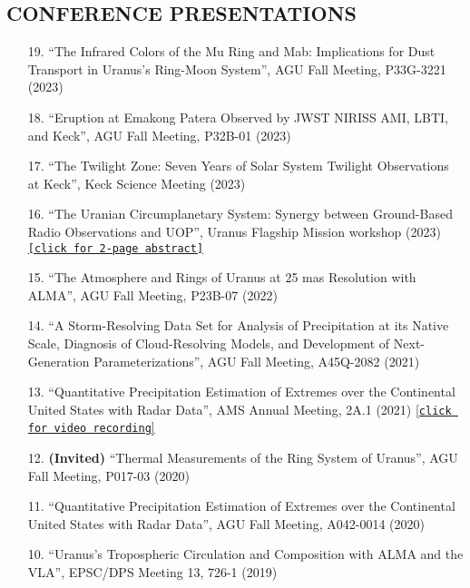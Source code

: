 \documentclass[margin, 10pt]{res} %
\begin{document}
\begin{resume}

\section{CONFERENCE PRESENTATIONS}


\begin{enumerate}
	
\item[19.] ``The Infrared Colors of the Mu Ring and Mab: Implications for Dust Transport in Uranus's Ring-Moon System'', AGU Fall Meeting, P33G-3221 (2023)
\item[18.] ``Eruption at Emakong Patera Observed by JWST NIRISS AMI, LBTI, and Keck'', AGU Fall Meeting, P32B-01 (2023)
\item[17.] ``The Twilight Zone: Seven Years of Solar System Twilight Observations at Keck'', Keck Science Meeting (2023)
\item[16.] ``The Uranian Circumplanetary System: Synergy between Ground-Based Radio Observations and UOP'', Uranus Flagship Mission workshop (2023) \href{https://www.hou.usra.edu/meetings/uranusflagship2023/pdf/8157.pdf}{\texttt{[click for 2-page abstract]}}
\item[15.] ``The Atmosphere and Rings of Uranus at 25 mas Resolution with ALMA'', AGU Fall Meeting, P23B-07 (2022)
\item[14.] ``A Storm-Resolving Data Set for Analysis of Precipitation at its Native Scale, Diagnosis of Cloud-Resolving Models, and Development of Next-Generation Parameterizations'', AGU Fall Meeting, A45Q-2082 (2021)
\item[13.] ``Quantitative Precipitation Estimation of Extremes over the Continental United States with Radar Data'', AMS Annual Meeting, 2A.1 (2021) \href{https://ams.confex.com/ams/101ANNUAL/meetingapp.cgi/Paper/381114}{[\texttt{click for video recording}]}
\item[12.] \textbf{(Invited)} ``Thermal Measurements of the Ring System of Uranus'', AGU Fall Meeting, P017-03 (2020)
\item[11.] ``Quantitative Precipitation Estimation of Extremes over the Continental United States with Radar Data'', AGU Fall Meeting, A042-0014 (2020)
\item[10.] ``Uranus's Tropospheric Circulation and Composition with ALMA and the VLA'', EPSC/DPS Meeting 13, 726-1 (2019)

\end{enumerate}
\end{resume}
\end{document}
